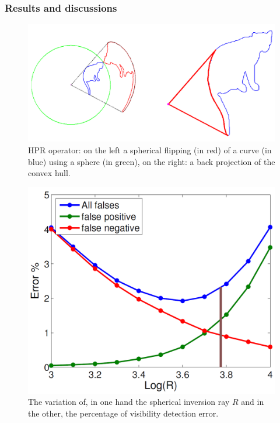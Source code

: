 \subsubsection{Results and discussions}
\begin{figure}
  \centering
  \includegraphics[scale=0.2]{img/hpr.png}
  \caption{HPR operator: on the left a spherical flipping (in red) of a curve (in blue) using a sphere (in green), on the right: a back projection of the convex hull.}
  \label{fig:hpr}
\end{figure}
\begin{figure}
  \centering
  \includegraphics[scale=0.35]{img/hpr-r.png}
  \caption{The variation of, in one hand the spherical inversion ray $R$ and in the other, the percentage of visibility detection error.}
  \label{fig:hpr-r}
\end{figure}

